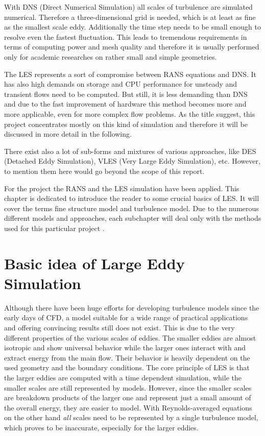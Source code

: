 With DNS (Direct Numerical Simulation) all scales of turbulence are simulated numerical. Therefore a three-dimensional grid is needed, which is at least as fine as the smallest scale eddy. Additionally the time step needs to be small enough to resolve even the fastest fluctuation. This leads to tremendous requirements in terms of computing power and mesh quality and therefore it is usually performed only for academic researches on rather small and simple geometries.

The LES represents a sort of compromise between RANS equations and DNS. It has also high demands on storage and CPU performance for unsteady and transient flows need to be computed. But still, it is less demanding than DNS and due to the fast improvement of hardware this method becomes more and more applicable, even for more complex flow problems. As the title suggest, this project concentrates mostly on this kind of simulation and therefore it will be discussed in more detail in the following.

There exist also a lot of sub-forms and mixtures of various approaches, like DES (Detached Eddy Simulation), VLES (Very Large Eddy Simulation), etc. However, to mention them here would go beyond the scope of this report.

For the project the RANS and the LES simulation have been applied. This chapter is dedicated to introduce the reader to some crucial basics of LES. It will cover the terms fine structure model and turbulence model. Due to the numerous different models and approaches, each subchapter will deal only with the methods used for this particular project \cite{versteeg, hassler}.
\section{Basic idea of Large Eddy Simulation}
Although there have been huge efforts for developing turbulence models since the early days of CFD, a model suitable for a wide range of practical applications and offering convincing results still does not exist. This is due to the very different properties of the various scales of eddies. The smaller eddies are almost isotropic and show universal behavior while the larger ones interact with and extract energy from the main flow. Their behavior is heavily dependent on the used geometry and the boundary conditions.
The core principle of LES is that the larger eddies are computed with a time dependent simulation, while the smaller scales are still represented by models. However, since the smaller scales are breakdown products of the larger one and represent just a small amount of the overall energy, they are easier to model. With Reynolds-averaged equations on the other hand \emph{all} scales need to be represented by a single turbulence model, which proves to be inaccurate, especially for the larger eddies.

